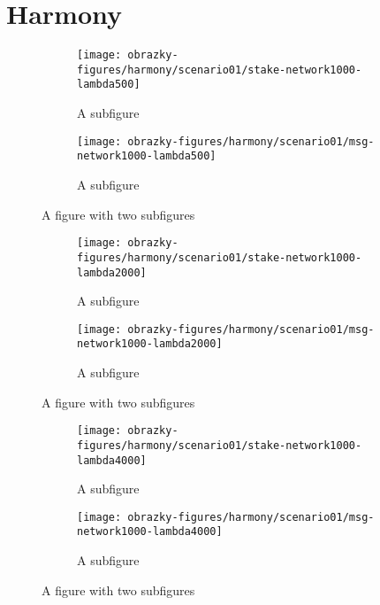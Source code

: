 

\chapter{Harmony}



\begin{figure}
	\centering
	\begin{subfigure}{.5\textwidth}
		\centering
		\texttt{[image: obrazky-figures/harmony/scenario01/stake-network1000-lambda500]}
		\caption{A subfigure}
		\label{fig:sub1}
	\end{subfigure}%
	\begin{subfigure}{.5\textwidth}
		\centering
		\texttt{[image: obrazky-figures/harmony/scenario01/msg-network1000-lambda500]}
		\caption{A subfigure}
		\label{fig:sub2}
	\end{subfigure}
	\caption{A figure with two subfigures}
\end{figure}



\begin{figure}
	\centering
	\begin{subfigure}{.5\textwidth}
		\centering
		\texttt{[image: obrazky-figures/harmony/scenario01/stake-network1000-lambda2000]}
		\caption{A subfigure}
		\label{fig:sub1}
	\end{subfigure}%
	\begin{subfigure}{.5\textwidth}
		\centering
		\texttt{[image: obrazky-figures/harmony/scenario01/msg-network1000-lambda2000]}
		\caption{A subfigure}
		\label{fig:sub2}
	\end{subfigure}
	\caption{A figure with two subfigures}
\end{figure}


\begin{figure}
\centering
\begin{subfigure}{.5\textwidth}
	\centering
	\texttt{[image: obrazky-figures/harmony/scenario01/stake-network1000-lambda4000]}
	\caption{A subfigure}
	\label{fig:sub1}
\end{subfigure}%
\begin{subfigure}{.5\textwidth}
	\centering
	\texttt{[image: obrazky-figures/harmony/scenario01/msg-network1000-lambda4000]}
	\caption{A subfigure}
	\label{fig:sub2}
\end{subfigure}
\caption{A figure with two subfigures}
\end{figure}

